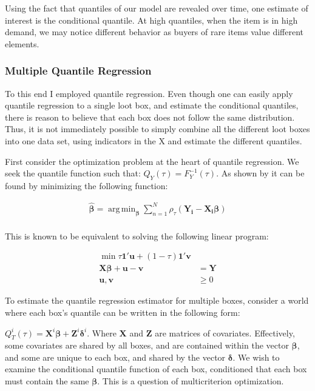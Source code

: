 \documentclass[12pt, letterpaper]{paper}
\DeclareMathOperator*{\argmin}{arg\,min}
\begin{document}
Using the fact that quantiles of our model are revealed over time, one
estimate of interest is the conditional quantile. At high quantiles,
when the item is in high demand, we may notice different behavior as
buyers of rare items value different elements.

\subsubsection{Multiple Quantile Regression}
\label{sec-4-6-1}

To this end I employed quantile regression. Even though one can easily apply
quantile regression to a single loot box, and estimate the conditional
quantiles, there is reason to believe that each box does not follow
the same distribution. Thus, it is not immediately possible to simply combine all
the different loot boxes into one data set, using indicators in the X
and estimate the different quantiles.

First consider the optimization problem at the heart of
quantile regression. We seek the quantile function such that: $Q_Y ( \tau
) = F_Y^{-1} (\tau)$. As shown by \cite{10.2307/1913643} it can be found by minimizing the
following function:

\begin{align*}
\hat{\bm{\beta}} = \argmin_{\bm{\beta}} \sum_{n=1}^N \rho_{\tau} ( \bm{Y_i} - \bm{X_i} \bm{\beta} )\\
\end{align*}

This is known to be equivalent to solving the following linear
program:

\begin{align*}
\min \tau \bm{1}' \bm{u} + (1-\tau) \bm{1}' \bm{v} &\\
\bm{X} \bm{\beta} + \bm{u} - \bm{v} &= \bm{Y}\\
\bm{u},\bm{v} &\geq 0
\end{align*}

To estimate the quantile regression estimator for multiple boxes,
consider a world where each box's quantile can be written in the
following form:

$Q_T^i (\tau ) = \bm{X}^i \bm{\beta} + \bm{Z}^i \bm{\delta}^i$. Where $\bm{X}$ and
$\bm{Z}$ are matrices of covariates. Effectively, some covariates are
shared by all boxes, and are contained within the vector $\bm{\beta}$, and some
are unique to each box, and shared by the vector $\bm{\delta}$. We wish to examine
the conditional quantile function of each box, conditioned that each
box must contain the same $\bm{\beta}$. This is a question of multicriterion
optimization. \cite{Boyd:2004:CO:993483}
\end{document}
